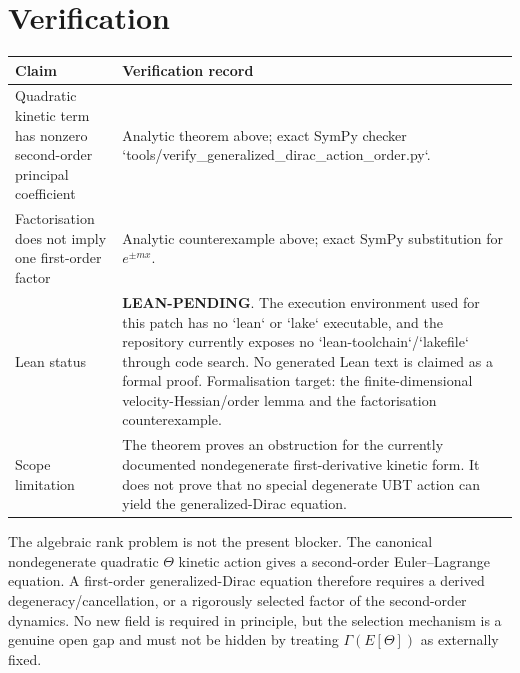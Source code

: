 \documentclass[11pt,a4paper]{article}
\begin{document}
\section{Verification}
\begin{center}
\begin{tabular}{p{}p{}}
Claim & Verification record \\ \hline
Quadratic kinetic term has nonzero second-order principal coefficient & Analytic theorem above; exact SymPy checker `tools/verify_generalized_dirac_action_order.py`. \\
Factorisation does not imply one first-order factor & Analytic counterexample above; exact SymPy substitution for $e^{\pm mx}$. \\
Lean status & \textbf{LEAN-PENDING}.  The execution environment used for this patch has no `lean` or `lake` executable, and the repository currently exposes no `lean-toolchain`/`lakefile` through code search.  No generated Lean text is claimed as a formal proof.  Formalisation target: the finite-dimensional velocity-Hessian/order lemma and the factorisation counterexample. \\
Scope limitation & The theorem proves an obstruction for the currently documented nondegenerate first-derivative kinetic form.  It does not prove that no special degenerate UBT action can yield the generalized-Dirac equation. \\
\end{tabular}
\end{center}

\begin{tcolorbox}[colback=yellow!7!white,colframe=yellow!55!black,title=Current verdict]
The algebraic rank problem is not the present blocker.  The canonical
nondegenerate quadratic $\Theta$ kinetic action gives a second-order
Euler--Lagrange equation.  A first-order generalized-Dirac equation therefore
requires a derived degeneracy/cancellation, or a rigorously selected factor of
the second-order dynamics.  No new field is required in principle, but the
selection mechanism is a genuine open gap and must not be hidden by treating
$\Gamma(E[\Theta])$ as externally fixed.
\end{tcolorbox}
\end{document}
